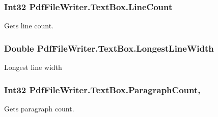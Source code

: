 \subsubsection[{\texorpdfstring{Line\+Count}{LineCount}}]{\setlength{\rightskip}{0pt plus 5cm}Int32 Pdf\+File\+Writer.\+Text\+Box.\+Line\+Count\hspace{0.3cm}{\ttfamily [get]}}\hypertarget{class_pdf_file_writer_1_1_text_box_a3ff5e10810b57c0b6c7b989913b5cebb}{}\label{class_pdf_file_writer_1_1_text_box_a3ff5e10810b57c0b6c7b989913b5cebb}


Gets line count. 

\subsubsection[{\texorpdfstring{Longest\+Line\+Width}{LongestLineWidth}}]{\setlength{\rightskip}{0pt plus 5cm}Double Pdf\+File\+Writer.\+Text\+Box.\+Longest\+Line\+Width\hspace{0.3cm}{\ttfamily [get]}}\hypertarget{class_pdf_file_writer_1_1_text_box_af0600b5186a343bf921cd9d84decb451}{}\label{class_pdf_file_writer_1_1_text_box_af0600b5186a343bf921cd9d84decb451}


Longest line width 

\subsubsection[{\texorpdfstring{Paragraph\+Count}{ParagraphCount}}]{\setlength{\rightskip}{0pt plus 5cm}Int32 Pdf\+File\+Writer.\+Text\+Box.\+Paragraph\+Count\hspace{0.3cm}{\ttfamily [get]}, {\ttfamily [set]}}\hypertarget{class_pdf_file_writer_1_1_text_box_a865eb68abe1b2d517c02ee4db0a8bb9e}{}\label{class_pdf_file_writer_1_1_text_box_a865eb68abe1b2d517c02ee4db0a8bb9e}


Gets paragraph count. 

